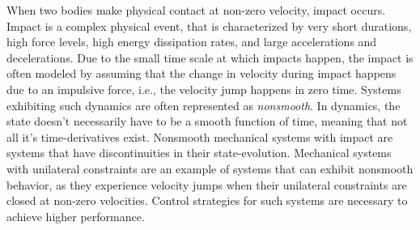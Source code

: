 \documentclass[../DC2017114Bouma.tex]{subfiles}
\begin{document}
When two bodies make physical contact at non-zero velocity, impact occurs. Impact is a complex physical event, that is characterized by very short durations, high force levels, high energy dissipation rates, and large accelerations and decelerations. Due to the small time scale at which impacts happen, the impact is often modeled by assuming that the change in velocity during impact happens due to an impulsive force, i.e., the velocity jump happens in zero time. Systems exhibiting such dynamics are often represented as \textit{nonsmooth}. In dynamics, the state doesn't necessarily have to be a smooth function of time, meaning that not all it's time-derivatives exist. Nonsmooth mechanical systems with impact are systems that have discontinuities in their state-evolution. Mechanical systems with unilateral constraints are an example of systems that can exhibit nonsmooth behavior, as they experience velocity jumps when their unilateral constraints are closed at non-zero velocities. Control strategies for such systems are necessary to achieve higher performance.
\end{document}
